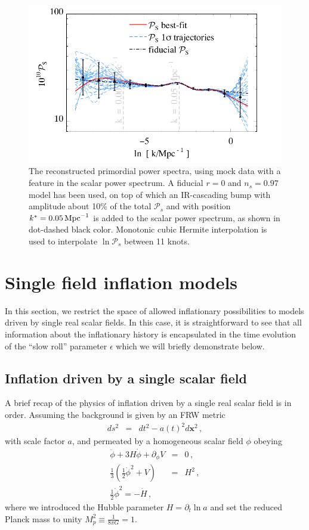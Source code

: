 \documentclass[a4paper,11pt]{article}
\renewcommand{\vec}[1]{{\mathbf #1}}
\def\mpc{{\rm\,Mpc}}
\renewcommand{\vec}[1]{{\mathbf #1}}
\def\mpc{{\rm\,Mpc}}
\newcommand{\pscalar}{{\mathcal{P}_s}}
\begin{document}
\begin{figure}
  \includegraphics[width=0.9\linewidth]{fc_bump_p11hermite_traj11} 
  \caption{The reconstructed primordial power spectra, using mock data
  with a feature in the scalar power spectrum. A fiducial $r=0$ and
  $n_s=0.97$ model has been used, on top of which an IR-cascading
  bump \cite{Barnaby2009a, Barnaby2009b} with amplitude about 10\% of
  the total $\pscalar$ and with position $k^* = 0.05 \mpc^{-1}$ is
  added to the scalar power spectrum, as shown in dot-dashed black color. Monotonic cubic Hermite
  interpolation is used to interpolate $\ln \pscalar$ between 11 knots.}  
  \label{fig:bump}
\end{figure}



\section{Single field inflation models}\label{sec:single_field}

In this section, we restrict the space of allowed inflationary
possibilities to models driven by single real scalar fields. In this
case, it is straightforward to see that all information about the
inflationary history is encapsulated in the time evolution of the
``slow roll'' parameter $\epsilon$ which we will briefly demonstrate
below.

\subsection{Inflation driven by a single scalar field}
A brief recap of the physics of inflation driven by a single real
scalar field is in order. Assuming the background is given by an FRW
metric
\begin{eqnarray}
  ds^2&=&dt^2-a(t)^2d\vec{x}^2\,,
\end{eqnarray}
with scale factor $a$, and permeated by a homogeneous scalar field
$\phi$ obeying
\begin{eqnarray}\label{eq:scalar_bg}
  \ddot\phi+3H\dot\phi+\partial_\phi V&=&0\,,\\
  \frac{1}{3}\left(\frac{1}{2}\dot\phi^2+V\right)&=&H^2\,,\\
  \frac{1}{2}\dot\phi^2=-\dot H\,,
\end{eqnarray}
where we introduced the Hubble parameter $H=\partial_t \ln a$ and set
the reduced Planck mass to unity $M_p^2\equiv\frac{1}{8\pi
  G}=1$. 
\end{document}
